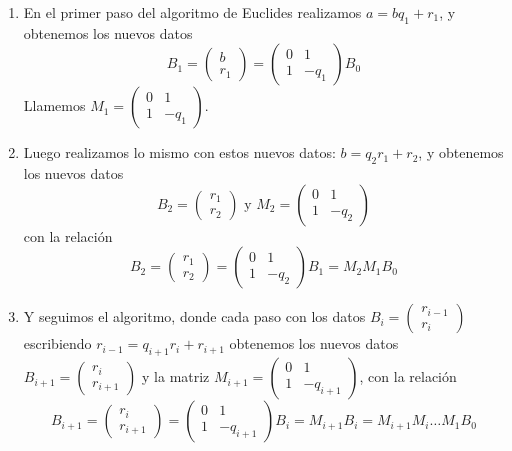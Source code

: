 \documentclass{report}
\begin{document}
\begin{enumerate}
	\item En el primer paso del algoritmo de Euclides realizamos $a=bq_1+r_1$, y obtenemos los nuevos datos $$B_1=\begin{pmatrix} b \\ r_1 \end{pmatrix}=\begin{pmatrix} 0 & 1 \\ 1 & -q_1 \end{pmatrix} B_0 $$
	      Llamemos $M_1=\begin{pmatrix} 0 & 1 \\ 1 & -q_1 \end{pmatrix}$.
	\item Luego realizamos lo mismo con estos nuevos datos: $b=q_2r_1+r_2$, y obtenemos los nuevos datos $$B_2=\begin{pmatrix} r_1 \\ r_2 \end{pmatrix} \text{ y } M_2=\begin{pmatrix} 0 & 1\\ 1 & -q_2 \end{pmatrix}$$
	      con la relación $$B_2=\begin{pmatrix} r_1 \\ r_2 \end{pmatrix}=\begin{pmatrix} 0 & 1 \\ 1 & -q_2 \end{pmatrix} B_1=M_2M_1B_0$$
	\item Y seguimos el algoritmo, donde cada paso con los datos $B_i=\begin{pmatrix} r_{i-1} \\ r_i \end{pmatrix} $ escribiendo $r_{i-1}=q_{i+1}r_i+r_{i+1}$ obtenemos los nuevos datos $B_{i+1}=\begin{pmatrix} r_i \\ r_{i+1} \end{pmatrix} $ y la matriz $M_{i+1}=\begin{pmatrix} 0 & 1 \\ 1 & -q_{i+1} \end{pmatrix} $, con la relación $$B_{i+1}=\begin{pmatrix} r_i \\ r_{i+1} \end{pmatrix} =\begin{pmatrix} 0 & 1 \\ 1 & -q_{i+1} \end{pmatrix} B_i=M_{i+1}B_i=M_{i+1}M_i\dots M_1B_0$$

\end{enumerate}
\end{document}

